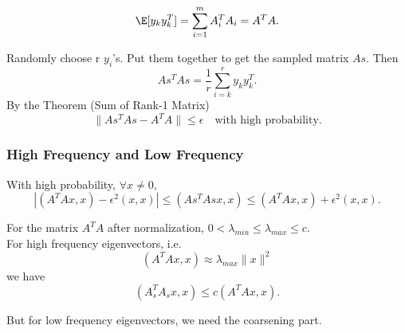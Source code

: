 $$
\E [y_k y_k^T] = \sum_{i=1}^m A_i^T A_i = A^T A.
$$

Randomly choose r $y_i$'s. Put them together to get the sampled matrix $As$. Then
$$
As^T As = \frac{1}{r} \sum_{i=k}^r y_k y_k^T.
$$
By the Theorem (Sum of Rank-1 Matrix)
$$
\| As^T As - A^T A \| \leq \epsilon  \quad \text{with high probability}.
$$


\subsubsection{High Frequency and Low Frequency}

With high probability, $\forall x \neq 0,$
\begin{equation}\label{star}
|(A^TA x,x) - \epsilon^2(x,x) | \leq (As^T As x,x) \leq (A^TA x,x) + \epsilon^2(x,x).
\end{equation}

For the matrix $A^T A$ after normalization, $0 < \lambda_{min} \leq \lambda_{max} \leq c$. \\
For high frequency eigenvectors, i.e.
$$
(A^T Ax,x)  \approx \lambda_{max} \|x\|^2
$$
we have
$$
(A_s^T A_s x,x) \leq c (A^TAx,x).
$$

But for low frequency eigenvectors, we need the coarsening part.
















